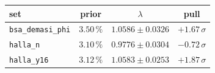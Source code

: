\begin{tabular}{lccc}
\toprule
set & prior & $\lambda$ & pull \\
\midrule
\texttt{bsa\_demasi\_phi} & $3.50\,\%$ & $1.0586 \pm 0.0326$ & $+1.67\,\sigma$ \\
\texttt{halla\_n} & $3.10\,\%$ & $0.9776 \pm 0.0304$ & $-0.72\,\sigma$ \\
\texttt{halla\_y16} & $3.12\,\%$ & $1.0583 \pm 0.0253$ & $+1.87\,\sigma$ \\
\bottomrule
\end{tabular}
